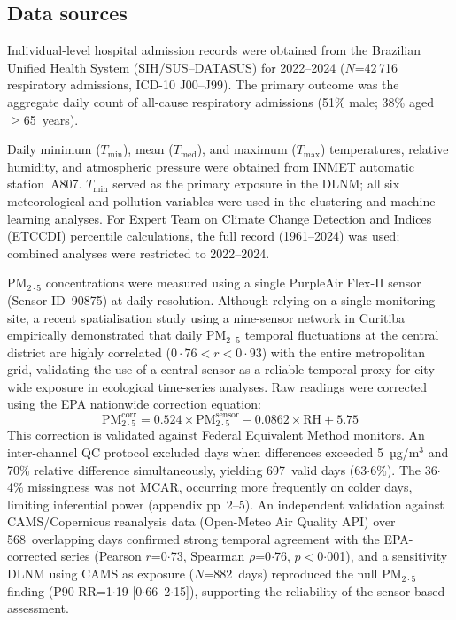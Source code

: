 \documentclass[review,number]{elsarticle}
\begin{document}
\subsection{Data sources}

Individual-level hospital admission records were obtained from the
Brazilian Unified Health System (SIH/SUS--DATASUS) for 2022--2024
($N$=42\,716 respiratory admissions, ICD-10 J00--J99). The primary
outcome was the aggregate daily count of all-cause respiratory
admissions (51\% male; 38\% aged $\geq$65~years).

Daily minimum ($T_\mathrm{min}$), mean ($T_\mathrm{med}$), and
maximum ($T_\mathrm{max}$) temperatures, relative humidity, and
atmospheric pressure were obtained from INMET automatic station~A807.
$T_\mathrm{min}$ served as the primary exposure in the DLNM; all six
meteorological and pollution variables were used in the clustering and
machine learning analyses. For Expert Team on Climate Change Detection
and Indices (ETCCDI) percentile calculations, the full record
(1961--2024) was used; combined analyses were restricted to 2022--2024.

$\text{PM}_{2{\cdot}5}$ concentrations were measured using a single PurpleAir
Flex-II sensor (Sensor ID~90875) at daily resolution. Although
relying on a single monitoring site, a recent spatialisation study
using a nine-sensor network in Curitiba empirically demonstrated
that daily $\text{PM}_{2{\cdot}5}$ temporal fluctuations at the central
district are highly correlated ($0{\cdot}76 < r < 0{\cdot}93$) with
the entire metropolitan grid, validating the use of a central sensor
as a reliable temporal proxy for city-wide exposure in ecological
time-series analyses.\cite{daCosta2024} Raw readings were corrected
using the EPA nationwide correction equation:\cite{Barkjohn2021}
%
\begin{equation}
  \mathrm{PM}_{2{\cdot}5}^{\mathrm{corr}} =
    0.524 \times \mathrm{PM}_{2{\cdot}5}^{\mathrm{sensor}}
    - 0.0862 \times \mathrm{RH} + 5.75
  \label{eq:epa}
\end{equation}
%
This correction is validated against Federal Equivalent Method
monitors.\cite{Holder2020,Magi2020,Barkjohn2022} An inter-channel
QC protocol excluded days when differences exceeded 5~µg/m$^3$ and
70\% relative difference simultaneously, yielding 697~valid days
(63${\cdot}$6\%). The 36${\cdot}$4\% missingness was not MCAR,
occurring more frequently on colder days, limiting inferential power
(appendix pp~2--5). An independent validation against
CAMS/Copernicus reanalysis data (Open-Meteo Air Quality API) over
568~overlapping days confirmed strong temporal agreement with the
EPA-corrected series (Pearson $r$=0${\cdot}$73, Spearman
$\rho$=0${\cdot}$76, $p$$<$0${\cdot}$001), and a sensitivity DLNM
using CAMS as exposure ($N$=882~days) reproduced the null
$\text{PM}_{2{\cdot}5}$ finding (P90 RR=1${\cdot}$19
[0${\cdot}$66--2${\cdot}$15]), supporting the reliability of the
sensor-based assessment.
\end{document}

